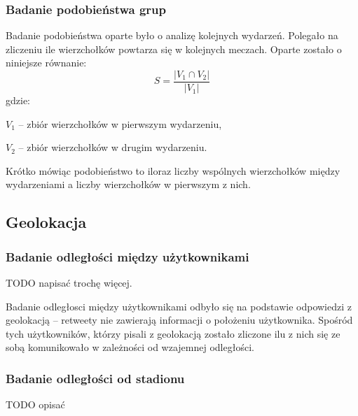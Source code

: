\subsubsection{Badanie podobieństwa grup}
\label{subsection:badaniepodobienstwagrup}
Badanie podobieństwa oparte było o analizę kolejnych wydarzeń. 
Polegało na zliczeniu ile wierzchołków powtarza się w kolejnych meczach.
Oparte zostało o niniejsze równanie:
\begin{equation}
S = \frac{|V_1 \cap V_2|}{|V_1|}
\end{equation}  
gdzie:

$V_1$ -- zbiór wierzchołków w pierwszym wydarzeniu,

$V_2$ -- zbiór wierzchołków w drugim wydarzeniu.

Krótko mówiąc podobieństwo to iloraz liczby wspólnych wierzchołków między 
wydarzeniami a liczby wierzchołków w pierwszym z nich.








\subsection{Geolokacja}
\subsubsection{Badanie odległości między użytkownikami}
\label{subsubsection:badanieodleglosci}
TODO napisać trochę więcej.

Badanie odległosci między użytkownikami odbyło się na podstawie odpowiedzi z
geolokacją -- retweety nie zawierają informacji o położeniu użytkownika.
Spośród tych użytkowników, którzy pisali z geolokacją zostało zliczone ilu z
nich się ze sobą komunikowało w zależności od wzajemnej odległości.






\subsubsection{Badanie odległości od stadionu}
\label{subsubsection:badanieodleglosciodstadionu}
TODO opisać 














